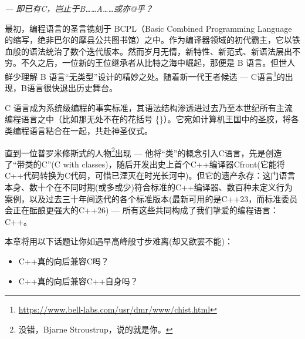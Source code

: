 \begin{flushright}
\textit{--- 即已有C，岂止于B……A……或亦@乎？}
\end{flushright}

最初，编程语言的圣言镌刻于 BCPL（Basic Combined Programming Language 的缩写，绝非巴尔的摩县公共图书馆）之中。作为编译器领域的初代霸主，它以铁血般的语法统治了数个迭代版本。然而岁月无情，新特性、新范式、新语法层出不穷。不久之后，一位新的王位继承者从比特之海中崛起，那便是 B 语言。但世人鲜少理解 B 语言“无类型”设计的精妙之处。随着新一代王者候选 --- C语言\footnote{\url{https://www.bell-labs.com/usr/dmr/www/chist.html}}的出现，B语言很快退出历史舞台。

C 语言成为系统级编程的事实标准，其语法结构渗透进过去乃至本世纪所有主流编程语言之中（比如那无处不在的花括号 \{\}）。它宛如计算机王国中的圣胶，将各类编程语言粘合在一起，共赴神圣仪式。

直到一位普罗米修斯式的人物\footnote{没错，Bjarne Stroustrup，说的就是你。}出现 --- 他将“类”的概念引入C语言，先是创造了“带类的C”(C with classes)，随后开发出史上首个C++编译器Cfront(它能将C++代码转换为C代码，可惜已湮灭在时光长河中)。但它的遗产永存：这门语言本身、数十个在不同时期(或多或少)符合标准的C++编译器、数百种未定义行为案例，以及过去三十年间迭代的各个标准版本(最新可用的是C++23，而标准委员会正在酝酿更强大的C++26) --- 所有这些共同构成了我们挚爱的编程语言：C++。

本章将用以下话题让你如遇早高峰般寸步难离(却又欲罢不能)：

\begin{itemize}
\item 
C++真的向后兼容C吗？

\item 
C++真的向后兼容C++自身吗？
\end{itemize}

























